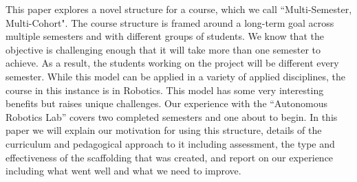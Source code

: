 This paper explores a novel structure for a course, which we call ``Multi-Semester, Multi-Cohort". The course structure is framed around a long-term goal across multiple semesters and with different groups of students. We know that the objective is challenging enough that it will take more than one semester to achieve. As a result, the students working on the project will be different every semester. While this model can be applied in a variety of applied disciplines, the course in this instance is in Robotics. This model has some very interesting benefits but raises unique challenges. Our experience with the ``Autonomous Robotics Lab'' covers two completed semesters and one about to begin. In this paper we will explain our motivation for using this structure, details of the curriculum and pedagogical approach to it including assessment, the type and effectiveness of the scaffolding that was created, and report on our experience including what went well and what we need to improve.
